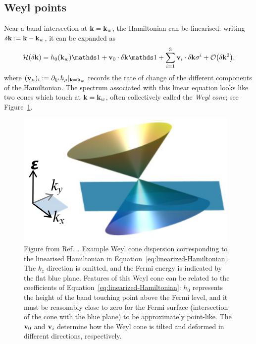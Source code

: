 \subsection{Weyl points}
Near a band intersection at $\vb{k}=\vb{k}_w$, the Hamiltonian can be linearised: writing $\delta\vb{k} := \vb{k} - \vb{k}_w$, it can be expanded as
\begin{equation}\label{eq:linearized-Hamiltonian}
	\Hc(\delta\k) = h_0(\k_w)\Id + \vb{v}_0\cdot\delta\k\Id + \sum_{i=1}^{3}\vb{v}_i\cdot\delta\k \sigma^i + \order{\delta\k^2},
\end{equation}
where $(\vb{v}_\mu)_i := \partial_{k^i}h_\mu |_{\vb{k}=\vb{k}_w}$ records the rate of change of the different components of the Hamiltonian. The spectrum associated with this linear equation looks like two cones which touch at $\vb{k}=\vb{k}_w$, often collectively called the \emph{Weyl cone}; see Figure~\ref{fig:Weyl-cone}.
\begin{figure}[htb!]
	\centering
	\includegraphics[width=.5\linewidth]{Images/Weyl-cone}
	\caption{Figure from Ref.~\cite{Zhang_Berry}. Example Weyl cone dispersion corresponding to the linearised Hamiltonian in Equation~\eqref{eq:linearized-Hamiltonian}. The $k_z$ direction is omitted, and the Fermi energy is indicated by the flat blue plane. Features of this Weyl cone can be related to the coefficients of Equation~\eqref{eq:linearized-Hamiltonian}: $h_0$ represents the height of the band touching point above the Fermi level, and it must be reasonably close to zero for the Fermi surface (intersection of the cone with the blue plane) to be approximately point-like. The $\vb{v}_0$ and $\vb{v}_i$ determine how the Weyl cone is tilted and deformed in different directions, respectively.}
	\label{fig:Weyl-cone}
\end{figure}
